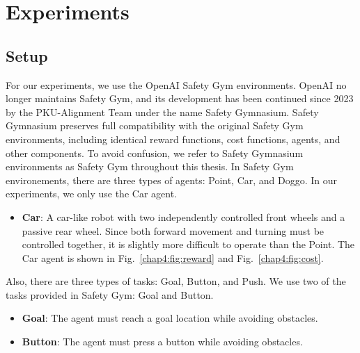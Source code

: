 
\chapter{Experiments}\label{chapter4}

\section{Setup} \label{chap4:sec:setup}

For our experiments, we use the OpenAI Safety Gym \cite{PPO-Lagrangian, Safety-Gymnasium} environments.
OpenAI no longer maintains Safety Gym, and its development has been continued since 2023 by the PKU-Alignment Team under the name Safety Gymnasium.
Safety Gymnasium preserves full compatibility with the original Safety Gym environments, including identical reward functions, cost functions, agents, and other components.
To avoid confusion, we refer to Safety Gymnasium environments as Safety Gym throughout this thesis.
In Safety Gym environements, there are three types of agents: Point, Car, and Doggo.
In our experiments, we only use the Car agent.
\begin{itemize}
    \item \textbf{Car}: A car-like robot with two independently controlled front wheels and a passive rear wheel. Since both forward movement and turning must be controlled together, it is slightly more difficult to operate than the Point. The Car agent is shown in Fig.~\ref{chap4:fig:reward} and Fig.~\ref{chap4:fig:cost}.
\end{itemize}
Also, there are three types of tasks: Goal, Button, and Push.
We use two of the tasks provided in Safety Gym: Goal and Button.
\begin{itemize}
    \item \textbf{Goal}: The agent must reach a goal location while avoiding obstacles.
    \item \textbf{Button}: The agent must press a button while avoiding obstacles.
\end{itemize}
